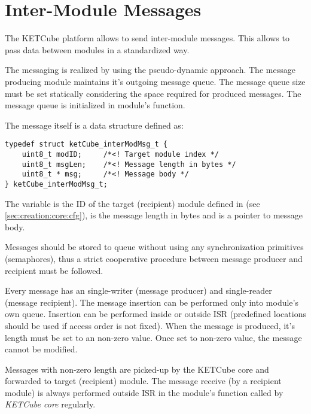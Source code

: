 
\clearpage
\section{Inter-Module Messages}\label{sec:msg}
The KETCube platform allows to send inter-module messages. This allows to pass data between modules in a standardized way.

The messaging is realized by using the pseudo-dynamic approach. The message producing module  maintains it's outgoing message queue. The message queue size must be set statically considering the space required for produced messages. The message queue is initialized in module's  function.

The message itself is a data structure defined as:
\begin{docCodeExample}
\begin{verbatim}
typedef struct ketCube_interModMsg_t {
    uint8_t modID;     /*<! Target module index */
    uint8_t msgLen;    /*<! Message length in bytes */
    uint8_t * msg;     /*<! Message body */
} ketCube_interModMsg_t;
\end{verbatim}
\end{docCodeExample}

The variable  is the ID of the target (recipient) module defined in  (see \ref{sec:creation:core:cfg}),  is the message length in bytes and  is a pointer to message body.

Messages should be stored to queue without using any synchronization primitives (semaphores), thus a strict cooperative procedure between message producer and recipient must be followed. 

Every message has an single-writer (message producer) and single-reader (message recipient). The message insertion can be performed only into module's own queue. Insertion can be performed inside or outside ISR (predefined locations should be used if access order is not fixed). When the message is produced, it's length must be set to an non-zero value. Once set to non-zero value, the message cannot be modified.

Messages with non-zero length are picked-up by the KETCube core and forwarded to target (recipient) module. The message receive (by a recipient module) is always performed outside ISR in the module's  function called by {\it KETCube core} regularly.

